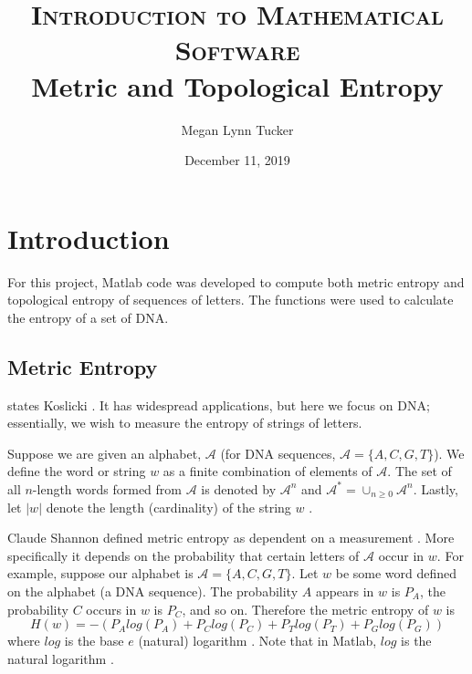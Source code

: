 \documentclass{article}
\title{
\normalfont \normalsize 
\textsc{Introduction to Mathematical Software} \\ [20pt]
\huge Metric and Topological Entropy
}
\author{Megan Lynn Tucker}
\date{December 11, 2019}
\begin{document}

\maketitle

\section{Introduction}
For this project, Matlab code was developed to compute both metric entropy and topological entropy of sequences of letters.
The functions were used to calculate the entropy of a set of DNA.

\subsection{Metric Entropy}
 states Koslicki \cite{1}.
It has widespread applications, but here we focus on DNA; essentially, we wish to measure the entropy of strings of letters.

Suppose we are given an alphabet, $\mathcal{A}$ (for DNA sequences, $\mathcal{A} = \{A, C, G, T\}$).
We define the word or string $w$ as a finite combination of elements of $\mathcal{A}$.
The set of all $n$-length words formed from $\mathcal{A}$ is denoted by $\mathcal{A}^n$ and $\mathcal{A}^* = \cup_{n \geq 0} \mathcal{A}^n$.
Lastly, let $|w|$ denote the length (cardinality) of the string $w$ \cite{1}.

Claude Shannon defined metric entropy as dependent on a measurement \cite{2}.
More specifically it depends on the probability that certain letters of $\mathcal{A}$ occur in $w$.
For example, suppose our alphabet is $\mathcal{A} = \{A, C, G, T\}$.
Let  $w$ be some word defined on the alphabet (a DNA sequence).
The probability $A$ appears in $w$ is $P_A$, the probability $C$ occurs in $w$ is $P_C$, and so on. 
Therefore the metric entropy of $w$ is
\begin{equation*}
    H(w) = -(P_Alog(P_A) + P_Clog(P_C) + P_Tlog(P_T) + P_Glog(P_G))
\end{equation*}
where $log$ is the base $e$ (natural) logarithm \cite{1}.
Note that in Matlab, $log$ is the natural logarithm \cite{4}. 
\end{document}
